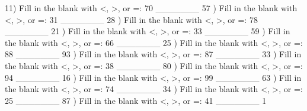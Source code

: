 \documentclass{article}%
\begin{document}
11) Fill in the blank with <, >, or =: 70 \_\_\_\_\_\_\_ 57%
\newline%
\newline%
) Fill in the blank with <, >, or =: 31 \_\_\_\_\_\_\_ 28%
\newline%
\newline%
) Fill in the blank with <, >, or =: 78 \_\_\_\_\_\_\_ 21%
\newline%
\newline%
) Fill in the blank with <, >, or =: 33 \_\_\_\_\_\_\_ 59%
\newline%
\newline%
) Fill in the blank with <, >, or =: 66 \_\_\_\_\_\_\_ 25%
\newline%
\newline%
) Fill in the blank with <, >, or =: 88 \_\_\_\_\_\_\_ 93%
\newline%
\newline%
) Fill in the blank with <, >, or =: 87 \_\_\_\_\_\_\_ 33%
\newline%
\newline%
) Fill in the blank with <, >, or =: 38 \_\_\_\_\_\_\_ 80%
\newline%
\newline%
) Fill in the blank with <, >, or =: 94 \_\_\_\_\_\_\_ 16%
\newline%
\newline%
) Fill in the blank with <, >, or =: 99 \_\_\_\_\_\_\_ 63%
\newline%
\newline%
) Fill in the blank with <, >, or =: 74 \_\_\_\_\_\_\_ 34%
\newline%
\newline%
) Fill in the blank with <, >, or =: 25 \_\_\_\_\_\_\_ 87%
\newline%
\newline%
) Fill in the blank with <, >, or =: 41 \_\_\_\_\_\_\_ 1%
\newline%
\end{document}
